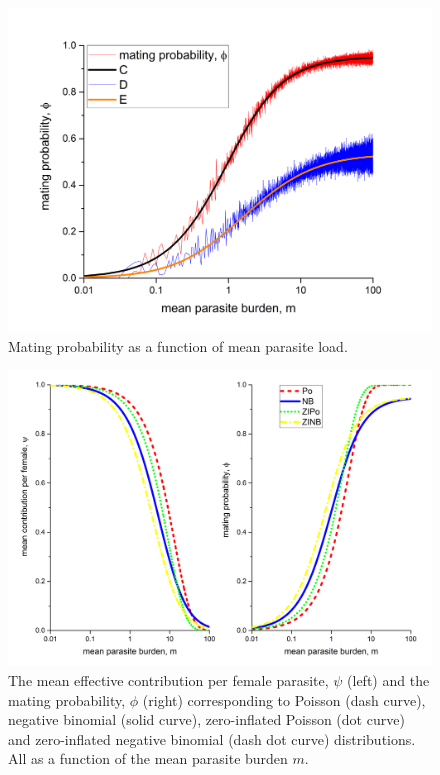 \documentclass[12pt,a4paper]{article}
\theoremstyle{plain}%
\theoremstyle{definition}
\theoremstyle{remark}
\begin{document}
\newpage

\begin{figure}
	\centering 	\includegraphics[width=0.9\linewidth]{mating-prob-nb}
	\caption{Mating probability as a function of mean parasite load.
	} 
\end{figure}


\begin{figure}[h!]
	\centering 	\includegraphics[width=0.99\linewidth]{psiandphi}
	\caption{The mean effective contribution per female parasite, $\psi$ (left) and the mating probability, $\phi$ (right) corresponding to Poisson (dash curve), negative binomial (solid curve), zero-inflated Poisson (dot curve) and zero-inflated negative binomial (dash dot curve) distributions. All as a function of the mean parasite burden $m$.}
	\label{fig:phi}
\end{figure}
\end{document}
